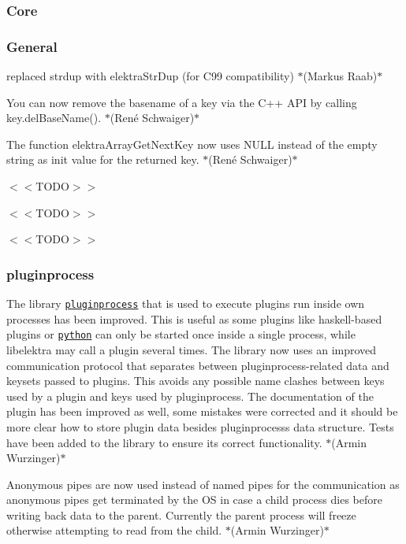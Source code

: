 \subsubsection*{Core}

\subsubsection*{General}


\begin{DoxyItemize}
\item replaced strdup with elektra\+Str\+Dup (for C99 compatibility) $\ast$(Markus Raab)$\ast$
\item You can now remove the basename of a key via the C++ A\+PI by calling {\ttfamily key.\+del\+Base\+Name()}. $\ast$(René Schwaiger)$\ast$
\item The function {\ttfamily elektra\+Array\+Get\+Next\+Key} now uses {\ttfamily N\+U\+LL} instead of the empty string as init value for the returned key. $\ast$(René Schwaiger)$\ast$
\item $<$$<$\+T\+O\+D\+O$>$$>$
\item $<$$<$\+T\+O\+D\+O$>$$>$
\item $<$$<$\+T\+O\+D\+O$>$$>$
\end{DoxyItemize}

\subsubsection*{pluginprocess}


\begin{DoxyItemize}
\item The library \href{http://master.libelektra.org/src/libs/pluginprocess}{\tt {\ttfamily pluginprocess}} that is used to execute plugins run inside own processes has been improved. This is useful as some plugins like haskell-\/based plugins or \href{http://libelektra.org/plugins/python}{\tt {\ttfamily python}} can only be started once inside a single process, while libelektra may call a plugin several times. The library now uses an improved communication protocol that separates between pluginprocess-\/related data and keysets passed to plugins. This avoids any possible name clashes between keys used by a plugin and keys used by pluginprocess. The documentation of the plugin has been improved as well, some mistakes were corrected and it should be more clear how to store plugin data besides pluginprocess\textquotesingle{}s data structure. Tests have been added to the library to ensure its correct functionality. $\ast$(Armin Wurzinger)$\ast$
\item Anonymous pipes are now used instead of named pipes for the communication as anonymous pipes get terminated by the OS in case a child process dies before writing back data to the parent. Currently the parent process will freeze otherwise attempting to read from the child. $\ast$(Armin Wurzinger)$\ast$
\end{DoxyItemize}

